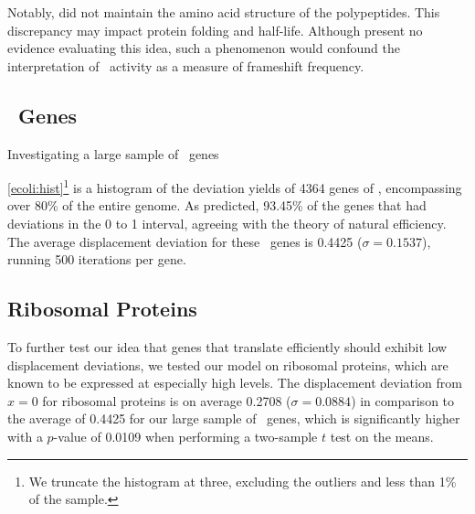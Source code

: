 \documentclass[12pt]{article}
\begin{document}
Notably, \citeauthor{weiss87} did not maintain the amino acid structure of the polypeptides.  
This discrepancy may impact protein folding and half-life.  Although \citeauthor{weiss87} 
present no evidence evaluating this idea, such a phenomenon would confound the interpretation 
of \bgals\ activity as a measure of frameshift frequency.

\subsection{\ecoli\ Genes}
\begin{cfigure}
  \caption{Investigating a large sample of \ecoli\ genes}
  \quad
\end{cfigure}

\autoref{ecoli:hist}\footnote{We truncate the histogram at three, excluding
  the outliers and less than 1\% of the sample.} is a histogram of the
deviation yields of 4364 genes of \ecoli, encompassing over 80\% of the entire
genome.  As predicted, 93.45\% of the genes that had deviations in the 0
to 1 interval, agreeing with the theory of natural efficiency.  The
average displacement deviation for these \ecoli\ genes is 0.4425 ($\sigma = 0.1537$), 
running 500 iterations per gene.

\subsection{Ribosomal Proteins}
\label{section:riboproteins}
To further test our idea that genes that translate efficiently should exhibit
low displacement deviations, we tested our model on ribosomal proteins, which
are known to be expressed at especially high levels.
The displacement deviation from $x=0$ for ribosomal proteins
is on average 0.2708 ($\sigma = 0.0884$) in comparison to the average of 0.4425 for our
large sample of \ecoli\ genes, which is significantly higher with a $p$-value of
0.0109 when performing a two-sample $t$ test on the means.
\end{document}
